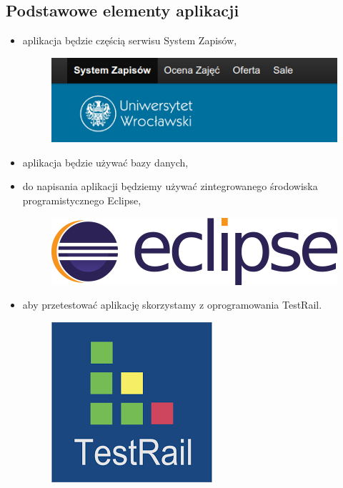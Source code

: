 \documentclass{article}
\begin{document}
\subsection{Podstawowe elementy aplikacji}
\begin{itemize}
 \item aplikacja będzie częścią serwisu System Zapisów,
\begin{figure}[H]
	\begin{center}
		\includegraphics[scale=0.3]{syst.png}
	\end{center}
\end{figure}
 \item aplikacja będzie używać bazy danych,
 \item do napisania aplikacji będziemy używać zintegrowanego środowiska programistycznego Eclipse,
 \begin{figure}[H]
	\begin{center}
		\includegraphics[scale=0.12]{eclipse.png}
	\end{center}
\end{figure}
 \item aby przetestować aplikację skorzystamy z oprogramowania TestRail.
 \begin{figure}[H]
	\begin{center}
		\includegraphics[scale=0.2]{testrail.png}
	\end{center}
\end{figure}
\end{itemize}
\end{document}
